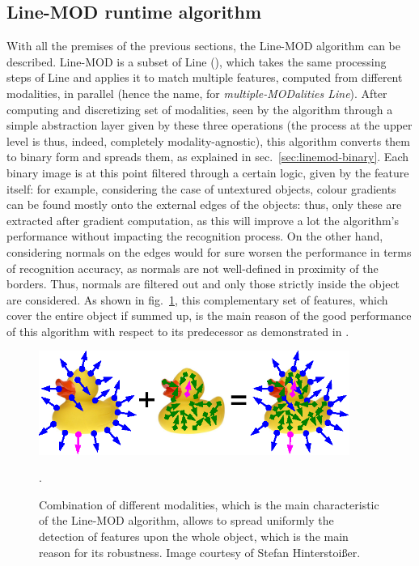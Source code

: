 \subsection{Line-MOD runtime algorithm} \label{sec:linemod-usage}
With all the premises of the previous sections, the Line-MOD algorithm
can be described. Line-MOD is a subset of Line
(\cite{linemod-origins}), which takes the same processing steps of
Line and applies it to match multiple features, computed from
different modalities, in parallel (hence the name, for
\emph{multiple-MODalities Line}). After computing and discretizing
set of modalities, seen by the algorithm through a simple abstraction
layer given by these three operations (the process at the upper level
is thus, indeed, completely modality-agnostic), this algorithm
converts them to binary form and spreads them, as explained in
sec.~\ref{sec:linemod-binary}. Each binary image is at this point filtered
through a certain logic, given by the feature itself: for example,
considering the case of untextured objects, colour gradients can be
found mostly onto the external edges of the objects: thus, only these
are extracted after gradient computation, as this will improve a lot
the algorithm's performance without impacting the recognition process. %
On the other hand, considering normals on the edges would for sure
worsen the performance in terms of recognition accuracy, as normals
are not well-defined in proximity of the borders. Thus, normals are
filtered out and only those strictly inside the object are
considered. As shown in fig.~\ref{fig:duck-linemod}, this
complementary set of features, which cover the entire object if summed
up, is the main reason of the good performance of this algorithm with
respect to its predecessor as demonstrated in \cite{linemod-paper}.

\begin{figure}[htbp]
\centering
\includegraphics[width=4in]{./Graphics/duck-linemod}
\caption{Combination of different modalities, which is the main
  characteristic of the Line-MOD algorithm, allows to spread uniformly
  the detection of features upon the whole object, which is the main
  reason for its robustness. Image courtesy of Stefan Hinterstoi\ss er. \label{fig:duck-linemod}}.
\end{figure}

